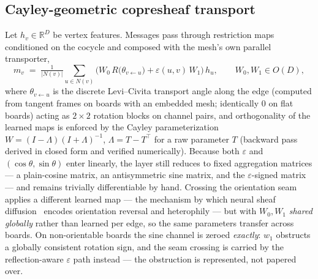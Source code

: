 \documentclass[11pt]{article}
\newcommand{\eps}{\varepsilon}
\begin{document}
\subsection{Cayley-geometric copresheaf transport}
\label{sec:transport}
Let $h_v\in\mathbb{R}^D$ be vertex features. Messages pass through
restriction maps conditioned on the cocycle and composed with the mesh's
own parallel transporter,
\begin{equation}
m_v \;=\; \tfrac{1}{|N(v)|}\!\!\sum_{u\in N(v)}\!\Big(W_0\,
R\big(\theta_{v\leftarrow u}\big) + \eps(u,v)\,W_1\Big)\,h_u,
\qquad W_0, W_1 \in O(D),
\label{eq:transport}
\end{equation}
where $\theta_{v\leftarrow u}$ is the discrete Levi--Civita transport
angle along the edge (computed from tangent frames on boards with an
embedded mesh; identically $0$ on flat boards) acting as $2{\times}2$
rotation blocks on channel pairs, and orthogonality of the learned maps
is enforced by the Cayley parameterization
$W = (I-\Lambda)(I+\Lambda)^{-1}$, $\Lambda = T - T^\top$ for a raw
parameter $T$ (backward pass derived in closed form and verified
numerically). Because both $\eps$ and $(\cos\theta,\sin\theta)$ enter
linearly, the layer still reduces to fixed aggregation matrices --- a
plain-cosine matrix, an antisymmetric sine matrix, and the $\eps$-signed
matrix --- and remains trivially differentiable by hand. Crossing the
orientation seam applies a different learned map --- the mechanism by
which neural sheaf diffusion~\cite{bodnar2022sheaf} encodes orientation
reversal and heterophily --- but with $W_0,W_1$ \emph{shared globally}
rather than learned per edge, so the same parameters transfer across
boards. On non-orientable boards the sine channel is zeroed
\emph{exactly}: $w_1$ obstructs a globally consistent rotation sign, and
the seam crossing is carried by the reflection-aware $\eps$ path instead
--- the obstruction is represented, not papered over.
\end{document}
